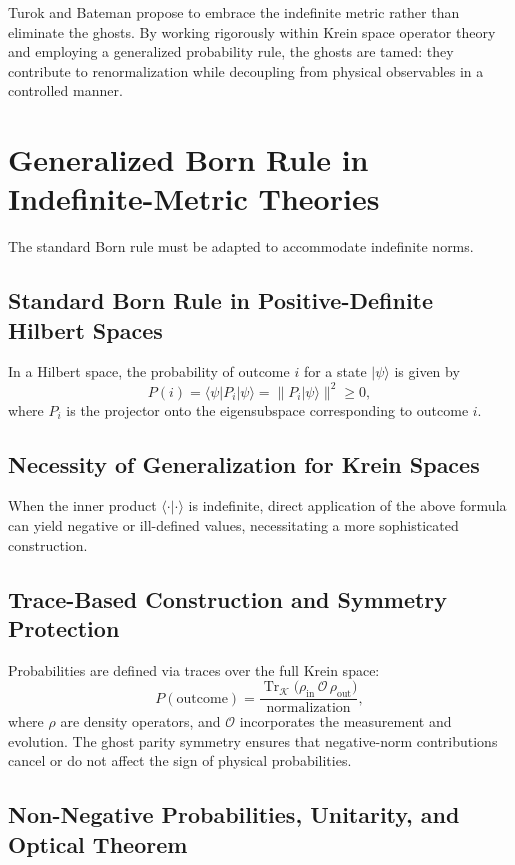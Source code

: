 \documentclass{article}
\begin{document}
Turok and Bateman propose to embrace the indefinite metric rather than eliminate the ghosts. By working rigorously within Krein space operator theory and employing a generalized probability rule, the ghosts are tamed: they contribute to renormalization while decoupling from physical observables in a controlled manner.

\section{Generalized Born Rule in Indefinite-Metric Theories}
\label{sec:born}

The standard Born rule must be adapted to accommodate indefinite norms.

\subsection{Standard Born Rule in Positive-Definite Hilbert Spaces}

In a Hilbert space, the probability of outcome $i$ for a state $|\psi\rangle$ is given by
\[
P(i) = \langle \psi | P_i | \psi \rangle = \| P_i |\psi\rangle \|^2 \geq 0,
\]
where $P_i$ is the projector onto the eigensubspace corresponding to outcome $i$.

\subsection{Necessity of Generalization for Krein Spaces}

When the inner product $\langle \cdot | \cdot \rangle$ is indefinite, direct application of the above formula can yield negative or ill-defined values, necessitating a more sophisticated construction.

\subsection{Trace-Based Construction and Symmetry Protection}

Probabilities are defined via traces over the full Krein space:
\[
P(\text{outcome}) = \frac{\operatorname{Tr}_{\mathcal{K}} \bigl( \rho_{\text{in}} \, \mathcal{O} \, \rho_{\text{out}} \bigr)}{\text{normalization}},
\]
where $\rho$ are density operators, and $\mathcal{O}$ incorporates the measurement and evolution. The ghost parity symmetry ensures that negative-norm contributions cancel or do not affect the sign of physical probabilities.

\subsection{Non-Negative Probabilities, Unitarity, and Optical Theorem}
\end{document}
